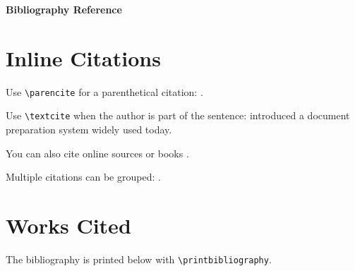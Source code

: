 \documentclass[11pt]{article}
\begin{document}
\centerline{\Large\bf Bibliography Reference}\par
\bigskip

\section{Inline Citations}

Use \texttt{\textbackslash parencite} for a parenthetical citation: \parencite{knuth1984}.

Use \texttt{\textbackslash textcite} when the author is part of the sentence:
\textcite{lamport1994} introduced a document preparation system widely used today.

You can also cite online sources \parencite{wikipedia-latex} or books \parencite{goossens1993}.

Multiple citations can be grouped: \parencite{knuth1984,lamport1994}.

\section{Works Cited}

The bibliography is printed below with \texttt{\textbackslash printbibliography}.

\printbibliography
\end{document}
